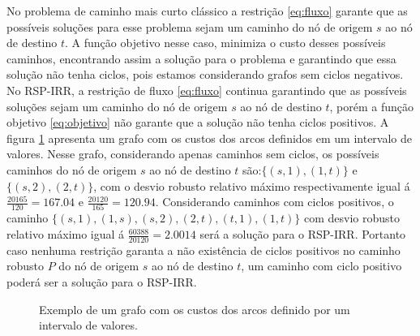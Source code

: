 ﻿No problema de caminho mais curto clássico a restrição \eqref{eq:fluxo} garante que as possíveis soluções para esse problema sejam um caminho do 
nó de origem $s$ ao nó de destino $t$. A função objetivo nesse caso, minimiza o custo desses 
possíveis caminhos, encontrando assim a solução para o problema e garantindo que essa solução não tenha ciclos, pois estamos considerando grafos sem
ciclos negativos. No RSP-IRR, a restrição de fluxo \eqref{eq:fluxo} continua garantindo que as possíveis soluções sejam um caminho do nó de origem
$s$ ao nó de destino $t$, porém a função objetivo \eqref{eq:objetivo} não garante que a solução não tenha ciclos positivos. A figura \ref{fig:grafo_1} apresenta um grafo com os custos dos arcos definidos em um intervalo de valores. Nesse grafo, considerando apenas caminhos
sem ciclos, os possíveis caminhos do nó de origem $s$ ao nó de destino $t$ são:$\{(s,1),(1,t)\}$ e $\{(s,2),(2,t)\}$, com o desvio robusto relativo máximo 
respectivamente igual á $\frac{20165}{120}=167.04$ e $\frac{20120}{165}=120.94$. Considerando caminhos com ciclos positivos, o caminho 
$\{(s,1),(1,s),(s,2),(2,t),(t,1),(1,t)\}$ com desvio robusto relativo máximo igual á $\frac{60388}{20120}=2.0014$ será a solução para o RSP-IRR. Portanto 
caso nenhuma restrição garanta a não existência de ciclos positivos no caminho robusto $P$ do nó de origem $s$ ao nó de destino $t$, um caminho 
com ciclo positivo poderá ser a solução para o RSP-IRR.
\begin{figure}[!h]
    \begin{center}
    \end{center}
    \caption{Exemplo de um grafo com os custos dos arcos definido por um intervalo de valores.}
    \label{fig:grafo_1}
\end{figure}
